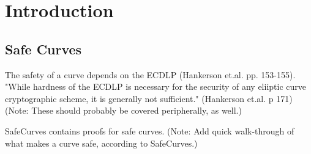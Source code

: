\section{Introduction}



\subsection{Safe Curves}

The safety of a curve depends on the ECDLP (Hankerson et.al. pp. 153-155). "While hardness of the ECDLP is necessary
for the security of any eliiptic curve cryptographic scheme, it is generally not sufficient." (Hankerson et.al. p 171)
(Note: These should probably be covered peripherally, as well.)

SafeCurves contains proofs for safe curves. (Note: Add quick walk-through of what makes a curve safe, according
to SafeCurves.)